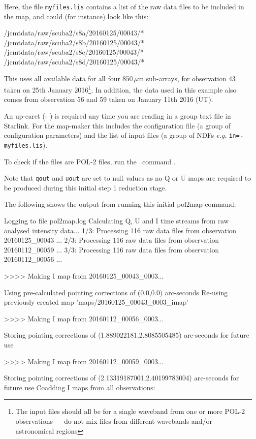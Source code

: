 Here, the file \texttt{myfiles.lis} contains a list of the raw data
files to be included in the map, and could (for instance) look like
this:

\begin{terminalv}
/jcmtdata/raw/scuba2/s8a/20160125/00043/*
/jcmtdata/raw/scuba2/s8b/20160125/00043/*
/jcmtdata/raw/scuba2/s8c/20160125/00043/*
/jcmtdata/raw/scuba2/s8d/20160125/00043/*
\end{terminalv}

This uses all available data for all four 850\,$\mu$m sub-arrays, for
observation 43 taken on 25th January 2016\footnote{The input files
  should all be for a single waveband from one or more POL-2
  observations --- do not mix files from different wavebands and/or
  astronomical regions}. In addition, the data used in this example
also comes from observation 56 and 59 taken on January 11th 2016 (UT).

\begin{tip}
  An up-caret ( $ \hat{} $ ) is required any time you are reading in a
  group text file in Starlink. For the map-maker this includes the
  configuration file (a group of configuration parameters) and the
  list of input files (a group of NDFs \emph{e.g.} \texttt{in= $
    \hat{} $ myfiles.lis}).

  To check if the files are POL-2 files, run the \smurf\ command
  .
\begin{terminalv}
\end{terminalv}
\end{tip}

Note that \texttt{qout} and \texttt{uout} are set to null values as no
Q or U maps are required to be produced during this initial step 1
reduction stage.

The following shows the output from running this initial pol2map
command:

\begin{terminalv}
Logging to file pol2map.log
Calculating Q, U and I time streams from raw analysed intensity data...
   1/3: Processing 116 raw data files from observation 20160125_00043 ...
   2/3: Processing 116 raw data files from observation 20160112_00059 ...
   3/3: Processing 116 raw data files from observation 20160112_00056 ...

>>>>   Making I map from 20160125_00043_0003...

   Using pre-calculated pointing corrections of (0.0,0.0) arc-seconds
   Re-using previously created map 'maps/20160125_00043_0003_imap'

>>>>   Making I map from 20160112_00056_0003...

Storing pointing corrections of (1.889022181,2.8085505485) arc-seconds for future use

>>>>   Making I map from 20160112_00059_0003...

Storing pointing corrections of (2.13319187001,2.40199783004) arc-seconds for future use
Coadding I maps from all observations:
\end{terminalv}

